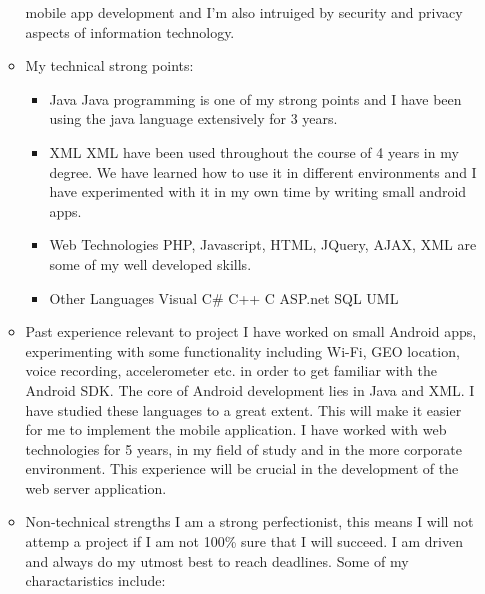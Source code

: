 \documentclass[12pt, oneside]{article}
\begin{document}
\begin{enumerate}
\begin{itemize}
				mobile app development and I'm also intruiged by security and privacy aspects of information technology.\newline
			\item My technical strong points:
				\begin{itemize}
				\item Java\newline
					Java programming is one of my strong points and I have been using the java language extensively for 3 years.
				\item XML\newline
					XML have been used throughout the course of 4 years in my degree. We have learned how to use it 
					in different environments and I have experimented with it in my own time by writing small android apps.
				\item Web Technologies\newline
					PHP, Javascript, HTML, JQuery, AJAX, XML are some of my well developed skills.
				\item Other Languages\newline
					Visual C\#\newline
					C++\newline
					C\newline
					ASP.net\newline
					SQL\newline
					UML\newline	
				\end{itemize}				
			\item Past experience relevant to project\newline\newline
				I have worked on small Android apps, experimenting with some functionality including Wi-Fi, GEO location, voice recording, accelerometer etc. in order to get familiar with the Android SDK. The core of Android development lies in Java and XML. I have studied these languages to a great extent. This will make it easier for me to implement the mobile application.  I have worked with web technologies for 5 years, in my field of study and in the more corporate environment. This experience will be crucial in the development of the web server application.\newline
			\item Non-technical strengths\newline\newline
				I am  a strong perfectionist, this means I will not attemp a project if I am not 100\% sure that I will succeed. I am driven and always do my utmost best to reach deadlines.  Some of my charactaristics include:\newline 

\end{itemize}
\end{enumerate}
\end{document}
